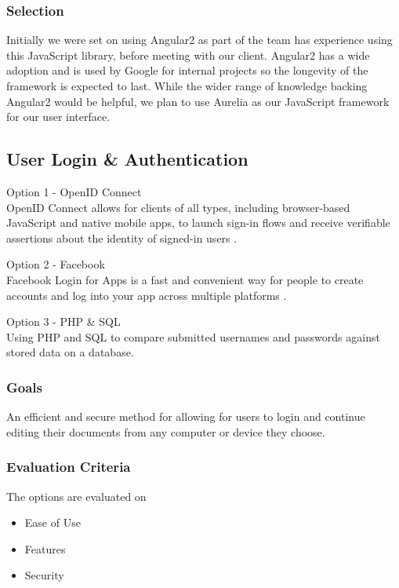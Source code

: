 \documentclass[onecolumn, draftclsnofoot,10pt, compsoc]{IEEEtran}
\begin{document}
{\medskip
\subsubsection{Selection}
\noindent Initially we were set on using Angular2 as part of the team has experience using this JavaScript library, before meeting with our client. Angular2 has a wide adoption and is used by Google for internal projects so the longevity of the framework is expected to last. While the wider range of knowledge backing Angular2 would be helpful, we plan to use Aurelia as our JavaScript framework for our user interface. 



\newpage
\subsection{User Login \& Authentication}
\noindent Option 1 - OpenID Connect \\
\noindent OpenID Connect allows for clients of all types, including browser-based JavaScript and native mobile apps, to launch sign-in flows and receive verifiable assertions about the identity of signed-in users \cite{OpenID}. 

\medskip

\noindent Option 2 - Facebook  \\
\noindent Facebook Login for Apps is a fast and convenient way for people to create accounts and log into your app across multiple platforms \cite{Facebook}. 

\medskip

\noindent Option 3 - PHP \& SQL \\
\noindent Using PHP and SQL to compare submitted usernames and passwords against stored data on a database.

\medskip

\subsubsection{Goals}
\noindent An efficient and secure method for allowing for users to login and continue editing their documents from any computer or device they choose.


\medskip

\subsubsection{Evaluation Criteria} 
\noindent The options are evaluated on
\begin{itemize}
\item Ease of Use
\item Features
\item Security
\end{itemize}


}
\end{document}
